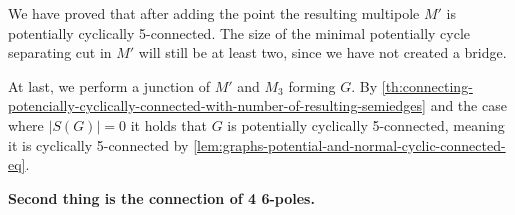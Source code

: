 \documentclass[12pt, twoside]{book}
\begin{document}
\begin{example}
	We have proved that after adding the point the resulting multipole $M'$ is potentially cyclically 5-connected. The size of the minimal potentially cycle separating cut in $M'$ will still be at least two, since we have not created a bridge.
	
	At last, we perform a junction of $M'$ and $M_3$ forming $G$. By \cref{th:connecting-potencially-cyclically-connected-with-number-of-resulting-semiedges} and the case where $|S(G)|=0$ it holds that $G$ is potentially cyclically 5-connected, meaning it is cyclically 5-connected by \cref{lem:graphs-potential-and-normal-cyclic-connected-eq}.
\end{example}

\textbf{Second thing is the connection of 4 6-poles.}

\end{document}
